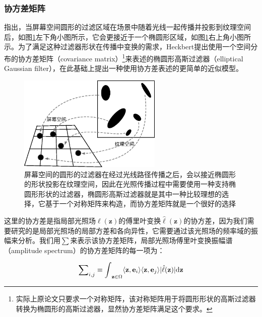 \subsubsection{协方差矩阵}
\cite{a:FundamentalsofTextureMappingandImageWarping}指出，当屏幕空间圆形的过滤区域在场景中随着光线一起传播并投影到纹理空间后，如图\ref{f:pt-elliptical-filter}左下角小图所示，它会更接近于一个椭圆形区域，如图\ref{f:pt-elliptical-filter}右上角小图所示。为了满足这种过滤器形状在传播中变换的需求，Heckbert提出使用一个空间分布的协方差矩阵（covariance matrix）\footnote{实际上原论文只要求一个对称矩阵，该对称矩阵用于将圆形形状的高斯过滤器转换为椭圆形的高斯过滤器，显然协方差矩阵满足这个要求。}来表述的椭圆形高斯过滤器（elliptical Gaussian filter），\cite{a:5DCovarianceTracingforEfficientDefocusandMotionBlur}在此基础上提出一种使用协方差表述的更简单的近似模型。

\begin{figure}
	\sidecaption
	\includegraphics[width=0.61\textwidth]{figures/pt/elliptical-filter}
	\caption{屏幕空间的圆形的过滤器在经过光线路径传播之后，会以接近椭圆形的形状投影在纹理空间，因此在光照传播过程中需要使用一种支持椭圆形形状的过滤器，椭圆形高斯过滤器就是其中一种比较理想的选择，它基于一个对称矩阵来构造，而协方差矩阵就是一个很好的选择}
	\label{f:pt-elliptical-filter}
\end{figure}

这里的协方差是指局部光照场$\ell(\mathbf{z})$的傅里叶变换$\hat{\ell}(\mathbf{z})$的协方差，因为我们需要研究的是局部光照场的局部方差和各向异性，它需要通过该光照场的频率域的振幅来分析。我们用$\sum$来表示该协方差矩阵，局部光照场傅里叶变换振幅谱（amplitude spectrum）的协方差矩阵的每一项为：

\begin{equation}
	\sum\nolimits_{i,j}\equiv{\rm \int\limits}_{\mathbf{z}\in\Omega}\langle\mathbf{z},\mathbf{e}_i\rangle\langle\mathbf{z},\mathbf{e}_j\rangle |\hat{\ell}(\mathbf{z})|{\rm d}\mathbf{z}
\end{equation}

